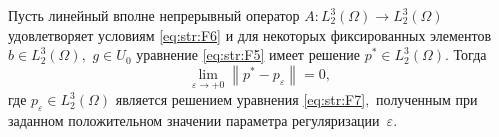 \smallskip

\hypertarget{str:th3}{}

\begin{theorem}[3]Пусть линейный вполне непрерывный оператор $A\colon L_{2}^{3} (\Omega)\to L_{2}^{3} (\Omega)$ удовлетворяет условиям \eqref{eq:str:F6} и для некоторых фиксированных элементов $b\in L_{2}^{3} (\Omega),$ $g\in U_{0} $ уравнение \eqref{eq:str:F5} имеет решение $p^{*} \in L_{2}^{3} (\Omega).$
Тогда $$\lim \limits_{\varepsilon \to +0} \left\| p^{*} -p_{\varepsilon } \right\| =0,$$ где $p_{\varepsilon } \in L_{2}^{3} (\Omega)$ является решением уравнения \eqref{eq:str:F7}$,$ полученным при заданном положительном значении параметра регуляризации~$\varepsilon.$
\end{theorem}

\smallskip

